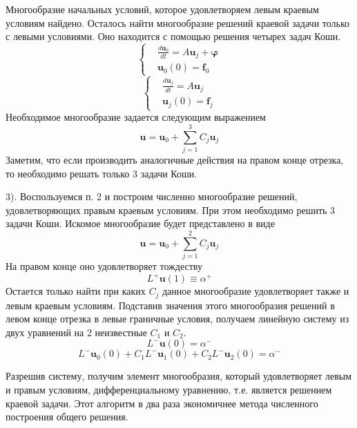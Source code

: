 \documentclass[12pt]{article}
\renewcommand{\u}{\mathbf{u}}
\renewcommand{\f}{{\boldsymbol \varphi}}
\newcommand{\Lm}{L^{-}}
\newcommand{\am}{\alpha^{-}}
\newcommand{\Lp}{L^{+}}
\newcommand{\ap}{\alpha^{+}}
\begin{document}
Многообразие начальных условий, которое удовлетворяем левым краевым условиям найдено. Осталось найти многообразие решений 
краевой задачи только с левыми условиями. Оно находится с помощью решения четырех задач Коши.
\[\left\{\begin{aligned}
&\displaystyle\frac{d\u_0}{dt} = A\u_j + \f\\
&\u_0(0) = \mathbf{f}_0
\end{aligned}\right.\]
\[\left\{\begin{aligned}
&\displaystyle\frac{d\u_j}{dt} = A\u_j\\
&\u_j(0) = \mathbf{f}_j
\end{aligned}\right.\]
Необходимое многообразие задается следующим выражением
\[
\u = \u_0 + \sum_{j=1}^3 C_j\u_j
\]
Заметим, что если производить аналогичные действия на правом конце отрезка, то необходимо решать только 3 задачи Коши.

3). Воспользуемся п. 2 и построим численно многообразие решений, удовлетворяющих правым краевым условиям. При этом необходимо решить 3 задачи Коши. Искомое многообразие
будет представлено в виде
\[
\u = \u_0 + \sum_{j=1}^2 C_j \u_j
\]
На правом конце оно удовлетворяет тождеству
\[
\Lp \u(1) \equiv \ap
\]
Остается только найти при каких $C_j$ данное многообразие удовлетворяет также и левым краевым условиям. Подставив значения этого многообразия решений в 
левом конце отрезка в левые граничные условия, получаем линейную систему из двух уравнений на 2 неизвестные $C_1$ и $C_2$. 
\[
\Lm \u(0) = \am
\]
\[
\Lm \u_0(0) + C_1 \Lm \u_1(0) + C_2 \Lm \u_2(0)= \am
\]

Разрешив систему, получим элемент многообразия,
который удовлетворяет левым и правым условиям, дифференциальному уравнению, т.е. является решением краевой задачи.
Этот алгоритм в два раза экономичнее метода численного построения общего решения.
\end{document}
